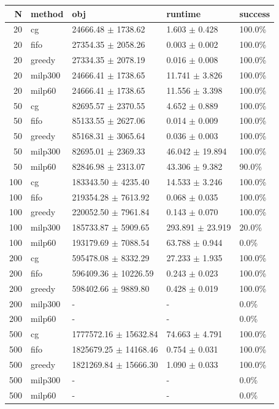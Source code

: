 \begin{tabular}{rllll}
\toprule
N & method & obj & runtime & success \\
\midrule
20 & cg & 24666.48 $\pm$ 1738.62 & 1.603 $\pm$ 0.428 & 100.0\% \\
20 & fifo & 27354.35 $\pm$ 2058.26 & 0.003 $\pm$ 0.002 & 100.0\% \\
20 & greedy & 27334.35 $\pm$ 2078.19 & 0.016 $\pm$ 0.008 & 100.0\% \\
20 & milp300 & 24666.41 $\pm$ 1738.65 & 11.741 $\pm$ 3.826 & 100.0\% \\
20 & milp60 & 24666.41 $\pm$ 1738.65 & 11.556 $\pm$ 3.398 & 100.0\% \\
50 & cg & 82695.57 $\pm$ 2370.55 & 4.652 $\pm$ 0.889 & 100.0\% \\
50 & fifo & 85133.55 $\pm$ 2627.06 & 0.014 $\pm$ 0.009 & 100.0\% \\
50 & greedy & 85168.31 $\pm$ 3065.64 & 0.036 $\pm$ 0.003 & 100.0\% \\
50 & milp300 & 82695.01 $\pm$ 2369.33 & 46.042 $\pm$ 19.894 & 100.0\% \\
50 & milp60 & 82846.98 $\pm$ 2313.07 & 43.306 $\pm$ 9.382 & 90.0\% \\
100 & cg & 183343.50 $\pm$ 4235.40 & 14.533 $\pm$ 3.246 & 100.0\% \\
100 & fifo & 219354.28 $\pm$ 7613.92 & 0.068 $\pm$ 0.035 & 100.0\% \\
100 & greedy & 220052.50 $\pm$ 7961.84 & 0.143 $\pm$ 0.070 & 100.0\% \\
100 & milp300 & 185733.87 $\pm$ 5909.65 & 293.891 $\pm$ 23.919 & 20.0\% \\
100 & milp60 & 193179.69 $\pm$ 7088.54 & 63.788 $\pm$ 0.944 & 0.0\% \\
200 & cg & 595478.08 $\pm$ 8332.29 & 27.233 $\pm$ 1.935 & 100.0\% \\
200 & fifo & 596409.36 $\pm$ 10226.59 & 0.243 $\pm$ 0.023 & 100.0\% \\
200 & greedy & 598402.66 $\pm$ 9889.80 & 0.428 $\pm$ 0.019 & 100.0\% \\
200 & milp300 & - & - & 0.0\% \\
200 & milp60 & - & - & 0.0\% \\
500 & cg & 1777572.16 $\pm$ 15632.84 & 74.663 $\pm$ 4.791 & 100.0\% \\
500 & fifo & 1825679.25 $\pm$ 14168.46 & 0.754 $\pm$ 0.031 & 100.0\% \\
500 & greedy & 1821269.84 $\pm$ 15666.30 & 1.090 $\pm$ 0.033 & 100.0\% \\
500 & milp300 & - & - & 0.0\% \\
500 & milp60 & - & - & 0.0\% \\
\bottomrule
\end{tabular}
